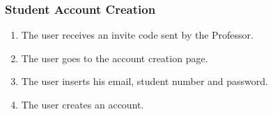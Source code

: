 \subsubsection{Student Account Creation}

\begin{enumerate}
    \item The user receives an invite code sent by the Professor.
    \item The user goes to the account creation page.
    \item The user inserts his email, student number and password.
    \item The user creates an account.
\end{enumerate}